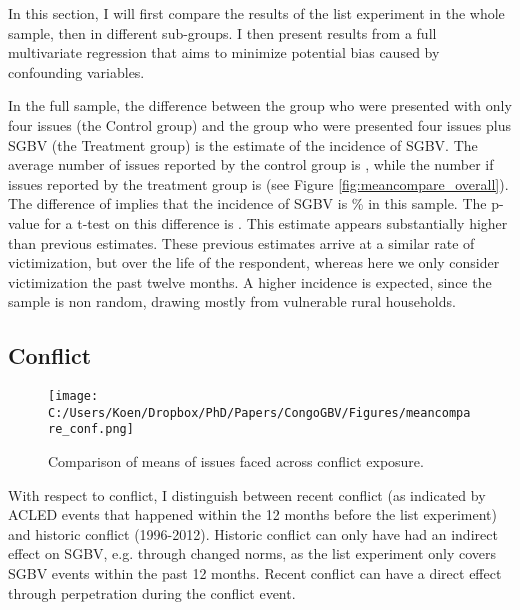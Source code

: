 In this section, I will first compare the results of the list experiment in the whole sample, then in different sub-groups. I then present results from a full multivariate regression that aims to minimize potential bias caused by confounding variables. 

In the full sample, the difference between the group who were presented with only four issues (the Control group) and the group who were presented four issues plus SGBV (the Treatment group) is the estimate of the incidence of SGBV. The average number of issues reported by the control group is , while the number if issues reported by the treatment group is  (see Figure \ref{fig:meancompare_overall}). The difference of  implies that the incidence of SGBV is \% in this sample. The p-value for a t-test on this difference is . This estimate appears substantially higher than previous estimates. These previous estimates \citep[e.g.][]{Peterson2018,Stark2017,Johnson2010} arrive at a similar rate of victimization, but over the life of the respondent, whereas here we only consider victimization the past twelve months. A higher incidence is expected, since the sample is non random, drawing mostly from vulnerable rural households. 

\subsection{Conflict} 

\begin{figure}[htb]
  \texttt{[image: C:/Users/Koen/Dropbox/PhD/Papers/CongoGBV/Figures/meancompare\_conf.png]}
  \caption{Comparison of means of issues faced across conflict exposure.}
  \label{fig:meancompare_conf}
\end{figure}

With respect to conflict, I distinguish between recent conflict (as indicated by ACLED events that happened within the 12 months before the list experiment) and historic conflict (1996-2012). Historic conflict can only have had an indirect effect on SGBV, e.g. through changed norms, as the list experiment only covers SGBV events within the past 12 months. Recent conflict can have a direct effect through perpetration during the conflict event. 

